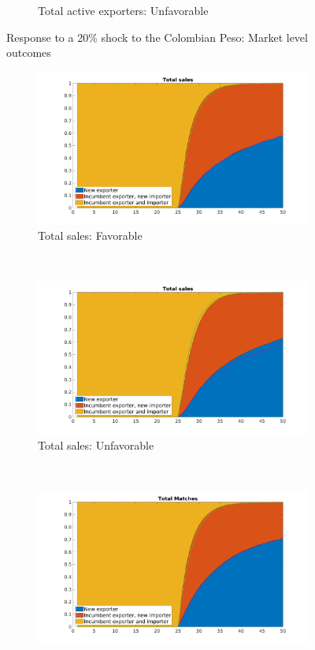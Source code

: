 \documentclass[12pt]{article}
\begin{document}
\begin{figure}[tbp]
\begin{subfigure}[b]{0.5\textwidth}
        \caption{Total active exporters: Unfavorable}
    \end{subfigure}
\caption{Response to a 20\% shock to the Colombian Peso: Market level
outcomes}
\label{fig:export_dynamics_macro}
\end{figure}

\begin{figure}[tbp]
\centering
\begin{subfigure}[b]{0.5\textwidth}
        \centering
        \includegraphics[width=\textwidth]{figures/total_sales_pct}
        \caption{Total sales: Favorable}
    \end{subfigure} ~ 
\begin{subfigure}[b]{0.5\textwidth}
        \centering
        \includegraphics[width=\textwidth]{figures/total_sales_pct_unf}
        \caption{Total sales: Unfavorable}
    \end{subfigure} \newline
~ 
\begin{subfigure}[b]{0.5\textwidth}
        \centering
        \includegraphics[width=\textwidth]{figures/total_matches_pct}

\end{subfigure}
\end{figure}
\end{document}
